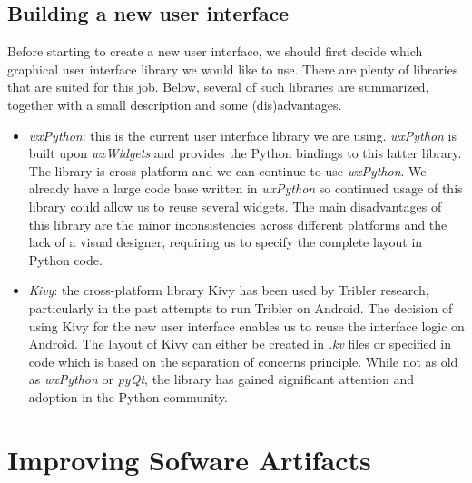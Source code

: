 \subsection{Building a new user interface}
Before starting to create a new user interface, we should first decide which graphical user interface library we would like to use. There are plenty of libraries that are suited for this job. Below, several of such libraries are summarized, together with a small description and some (dis)advantages.
\begin{itemize}
	\item \emph{wxPython}: this is the current user interface library we are using. \emph{wxPython} is built upon \emph{wxWidgets} and provides the Python bindings to this latter library. The library is cross-platform and we can continue to use \emph{wxPython}. We already have a large code base written in \emph{wxPython} so continued usage of this library could allow us to reuse several widgets. The main disadvantages of this library are the minor inconsistencies across different platforms and the lack of a visual designer, requiring us to specify the complete layout in Python code.
	\item \emph{Kivy}: the cross-platform library Kivy has been used by Tribler research, particularly in the past attempts to run Tribler on Android\cite{de2014android}\cite{sabee2014tribler}. The decision of using Kivy for the new user interface enables us to reuse the interface logic on Android. The layout of Kivy can either be created in \emph{.kv} files or specified in code which is based on the separation of concerns principle. While not as old as \emph{wxPython} or \emph{pyQt}, the library has gained significant attention and adoption in the Python community.
\end{itemize}

\section{Improving Sofware Artifacts}
